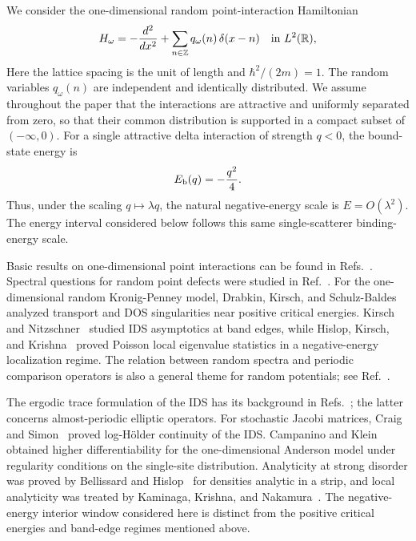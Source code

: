 \documentclass[12pt,a4paper]{article}
\numberwithin{equation}{section}
\newcommand{\refcite}[1]{\cite{#1}}
\newcommand{\R}{\mathbb R}
\newcommand{\Z}{\mathbb Z}
\begin{document}
We consider the one-dimensional random point-interaction Hamiltonian
\begin{equation}
H_\omega=-\frac{d^2}{d x^2}
 +\sum_{n\in\Z}q_\omega(n)\,\delta(x-n)
\quad\hbox{in }L^2(\R),
\label{formal-H}
\end{equation}
Here the lattice spacing is the unit of length and $\hbar^2/(2m)=1$.
The random variables $q_\omega(n)$ are independent and identically
distributed.  We assume throughout the paper that the interactions are
attractive and uniformly separated from zero, so that their common
distribution is supported in a compact subset of $(-\infty,0)$.  For a single
attractive delta interaction of strength $q<0$, the bound-state energy is
\begin{equation}
E_{\rm b}(q)=-\frac{q^2}{4}.
\label{single-bound-state}
\end{equation}
Thus, under the scaling $q\mapsto\lambda q$, the natural negative-energy scale
is $E=O(\lambda^2)$.  The energy interval considered below follows this same
single-scatterer binding-energy scale.

Basic results on one-dimensional point interactions can be found in
Refs.~\refcite{AlbeverioEtAl1984,Albeverio2005}.  Spectral questions for random
point defects were studied in Ref.~\refcite{AlbeverioHKM1982}.  For the
one-dimensional random Kronig-Penney model, Drabkin, Kirsch, and
Schulz-Baldes~\cite{DrabkinKirschSchulzBaldes2012} analyzed transport and DOS
singularities near positive critical energies.  Kirsch and
Nitzschner~\cite{KirschNitzschner1990} studied IDS asymptotics at band edges,
while Hislop, Kirsch, and Krishna~\cite{HislopKirschKrishna2020} proved
Poisson local eigenvalue statistics in a negative-energy localization regime.
The relation between random spectra and periodic comparison operators is
also a general theme for random potentials; see
Ref.~\refcite{KirschMartinelli1982}.

The ergodic trace formulation of the IDS has its background in
Refs.~\refcite{Pastur1980,Shubin1979}; the latter concerns almost-periodic
elliptic operators.  For stochastic Jacobi matrices, Craig and
Simon~\cite{CraigSimon1983} proved log-H\"older continuity of the IDS.
Campanino and Klein~\cite{CampaninoKlein1986} obtained higher differentiability
for the one-dimensional Anderson model under regularity conditions on the
single-site distribution.  Analyticity at strong disorder was proved by
Bellissard and Hislop~\cite{BellissardHislop2007} for densities analytic in a
strip, and local analyticity was treated by Kaminaga, Krishna, and
Nakamura~\cite{KaminagaKrishnaNakamura2012}.  The negative-energy interior
window considered here is distinct from the positive critical energies and
band-edge regimes mentioned above.
\end{document}

